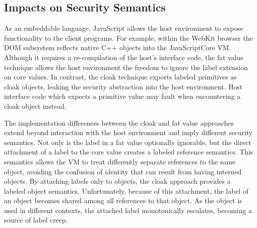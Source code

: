 \subsection{Impacts on Security Semantics}
\label{sec:impacts-on-security-semantics}

As an embeddable language, JavaScript allows the host environment to expose functionality to the client programs.
For example, within the WebKit browser the DOM subsystem reflects native C++ objects into the JavaScriptCore VM.
Although it requires a re-compilation of the host's interface code, the fat value technique allows the host environment the freedom to ignore the label extension on core values.
In contrast, the cloak technique exports labeled primitives as cloak objects, leaking the security abstraction into the host environment.
Host interface code which expects a primitive value may fault when encountering a cloak object instead.

The implementation differences between the cloak and fat value approaches extend beyond interaction with the host environment and imply different security semantics.
Not only is the label in a fat value optionally ignorable, but the direct attachment of a label to the core value creates a labeled reference semantics.
This semantics allows the VM to treat differently separate references to the same object, avoiding the confusion of identity that can result from having interned objects.
By attaching labels only to objects, the cloak approach provides a labeled object semantics.
Unfortunately, because of this attachment, the label of an object becomes shared among all references to that object.
As the object is used in different contexts, the attached label monotonically escalates, becoming a source of label creep.

\medskip
\begin{figure}[h]
\centering
{}
\end{figure}
\medskip


